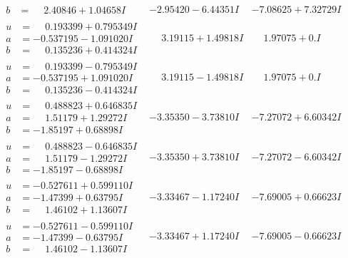 \documentclass[1p]{elsarticle_modified}
\theoremstyle{definition}
\begin{document}
$$\begin{array}{c|c|c}
\begin{aligned}
b &= \phantom{-}2.40846 + 1.04658 I\end{aligned}
 & -2.95420 - 6.44351 I & -7.08625 + 7.32729 I \\ \hline\begin{aligned}
u &= \phantom{-}0.193399 + 0.795349 I \\
a &= -0.537195 - 1.091020 I \\
b &= \phantom{-}0.135236 + 0.414324 I\end{aligned}
 & \phantom{-}3.19115 + 1.49818 I & \phantom{-}1.97075 + 0. I\phantom{ +0.000000I} \\ \hline\begin{aligned}
u &= \phantom{-}0.193399 - 0.795349 I \\
a &= -0.537195 + 1.091020 I \\
b &= \phantom{-}0.135236 - 0.414324 I\end{aligned}
 & \phantom{-}3.19115 - 1.49818 I & \phantom{-}1.97075 + 0. I\phantom{ +0.000000I} \\ \hline\begin{aligned}
u &= \phantom{-}0.488823 + 0.646835 I \\
a &= \phantom{-}1.51179 + 1.29272 I \\
b &= -1.85197 + 0.68898 I\end{aligned}
 & -3.35350 - 3.73810 I & -7.27072 + 6.60342 I \\ \hline\begin{aligned}
u &= \phantom{-}0.488823 - 0.646835 I \\
a &= \phantom{-}1.51179 - 1.29272 I \\
b &= -1.85197 - 0.68898 I\end{aligned}
 & -3.35350 + 3.73810 I & -7.27072 - 6.60342 I \\ \hline\begin{aligned}
u &= -0.527611 + 0.599110 I \\
a &= -1.47399 + 0.63795 I \\
b &= \phantom{-}1.46102 + 1.13607 I\end{aligned}
 & -3.33467 - 1.17240 I & -7.69005 + 0.66623 I \\ \hline\begin{aligned}
u &= -0.527611 - 0.599110 I \\
a &= -1.47399 - 0.63795 I \\
b &= \phantom{-}1.46102 - 1.13607 I\end{aligned}
 & -3.33467 + 1.17240 I & -7.69005 - 0.66623 I \\ \hline\begin{aligned}

\end{aligned}
\end{array}$$
\end{document}
